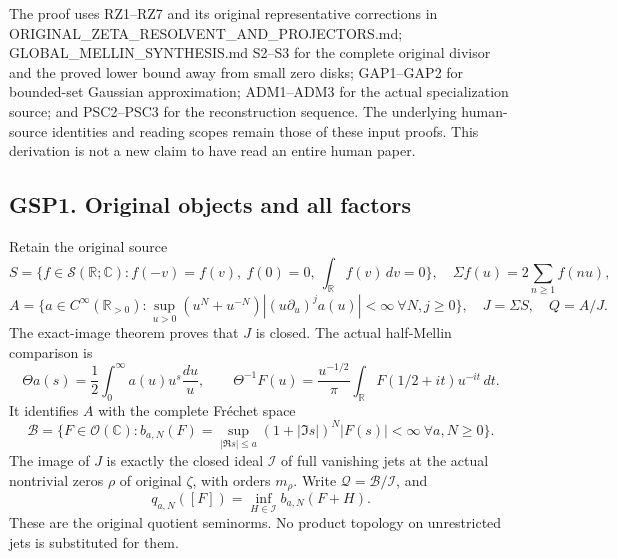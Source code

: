 The proof uses RZ1--RZ7 and its original representative corrections in
ORIGINAL\_ZETA\_RESOLVENT\_AND\_PROJECTORS.md;
GLOBAL\_MELLIN\_SYNTHESIS.md S2--S3 for the complete original divisor
and the proved lower bound away from small zero disks; GAP1--GAP2 for
bounded-set Gaussian approximation; ADM1--ADM3 for the actual
specialization source; and PSC2--PSC3 for the reconstruction sequence.
The underlying human-source identities and reading scopes remain those
of these input proofs. This derivation is not a new claim to have read
an entire human paper.

\subsection{GSP1. Original objects and all
factors}\label{gsp1.-original-objects-and-all-factors}

Retain the original source \[
S=\{f\in\mathcal S(\mathbb R;\mathbb C):f(-v)=f(v),\ f(0)=0,
\ \int_{\mathbb R}f(v)\,dv=0\},
\quad \Sigma f(u)=2\sum_{n\ge1}f(nu),
\] \[
A=\{a\in C^\infty(\mathbb R_{>0}):
\sup_{u>0}(u^N+u^{-N})|(u\partial_u)^ja(u)|<\infty\ \forall N,j\ge0\},
\quad J=\Sigma S,\quad Q=A/J.
\tag{GSP1.1}
\] The exact-image theorem proves that \(J\) is closed. The actual
half-Mellin comparison is \[
\Theta a(s)=\frac12\int_0^\infty a(u)u^s\frac{du}{u},\qquad
\Theta^{-1}F(u)=\frac{u^{-1/2}}{\pi}
\int_{\mathbb R}F(1/2+it)u^{-it}\,dt.
\tag{GSP1.2}
\] It identifies \(A\) with the complete Fréchet space \[
\mathcal B=\{F\in\mathcal O(\mathbb C):
b_{a,N}(F)=\sup_{|\Re s|\le a}(1+|\Im s|)^N|F(s)|<\infty
\ \forall a,N\ge0\}.
\tag{GSP1.3}
\] The image of \(J\) is exactly the closed ideal \(\mathcal I\) of full
vanishing jets at the actual nontrivial zeros \(\rho\) of original
\(\zeta\), with orders \(m_\rho\). Write
\(\mathcal Q=\mathcal B/\mathcal I\), and \[
q_{a,N}([F])=\inf_{H\in\mathcal I}b_{a,N}(F+H).
\tag{GSP1.4}
\] These are the original quotient seminorms. No product topology on
unrestricted jets is substituted for them.

